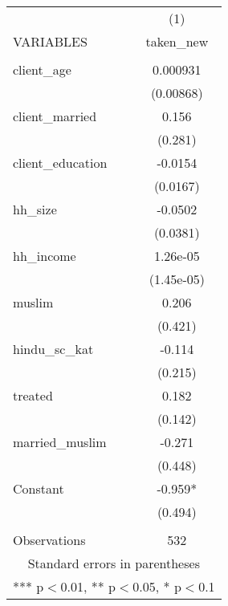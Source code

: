 \begin{tabular}{lc} \hline
 & (1) \\
VARIABLES & taken\_new \\ \hline
 &  \\
client\_age & 0.000931 \\
 & (0.00868) \\
client\_married & 0.156 \\
 & (0.281) \\
client\_education & -0.0154 \\
 & (0.0167) \\
hh\_size & -0.0502 \\
 & (0.0381) \\
hh\_income & 1.26e-05 \\
 & (1.45e-05) \\
muslim & 0.206 \\
 & (0.421) \\
hindu\_sc\_kat & -0.114 \\
 & (0.215) \\
treated & 0.182 \\
 & (0.142) \\
married\_muslim & -0.271 \\
 & (0.448) \\
Constant & -0.959* \\
 & (0.494) \\
 &  \\
 Observations & 532 \\ \hline
\multicolumn{2}{c}{ Standard errors in parentheses} \\
\multicolumn{2}{c}{ *** p$<$0.01, ** p$<$0.05, * p$<$0.1} \\
\end{tabular}
